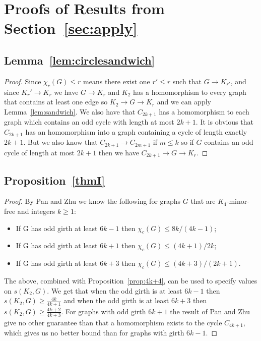 \documentclass[11pt,a4paper]{article}
\begin{document}
\section{Proofs of Results from Section~\ref{sec:apply}}

\subsection*{Lemma~\ref{lem:circlesandwich}}
\begin{proof}
Since $\chi_c(G) \leq r$ means there exist one $r' \leq r$ such that $G \rightarrow K_{r'}$, and since $K_r' \rightarrow K_r$ we have $G \rightarrow K_r$ and $K_2$ has a homomorphism to every graph that contains at least one edge so $K_2 \rightarrow G \rightarrow K_r$ and we can apply Lemma~\ref{lem:sandwich}. We also have that $C_{2k+1}$ has a homomorphism to each graph which contains an odd cycle with length at most $2k+1$. It is obvious that $C_{2k+1}$ has an homomorphism into a graph containing a cycle of length exactly $2k+1$. But we also know that $C_{2k+1} \rightarrow C_{2m+1}$ if $m \leq k$ so if $G$ contains an odd cycle of length at most $2k+1$ then we have $C_{2k+1} \rightarrow G \rightarrow K_r$. 
\end{proof}

\subsection*{Proposition~\ref{thmI}}
\begin{proof}
By Pan and Zhu we know the following for graphs $G$ that are
$K_4$-minor-free and integers $k\geq 1$:
\begin{itemize}
\item If G has odd girth at least $6k-1$ then $\chi_c(G)\leq 8k/(4k-1)$;
\item If G has odd girth at least $6k+1$ then $\chi_c(G)\leq (4k+1)/2k$;
\item If G has odd girth at least $6k+3$ then $\chi_c(G)\leq
(4k+3)/(2k+1)$.
\end{itemize}
The above, combined with Proposition~\ref{prop:4k+4}, can be used to
specify values on $s(K_2,G)$. We get that when the odd girth is at least
$6k-1$ then $s(K_2,G) \geq \frac{4k}{4k+1}$ and when the odd girth is at
least $6k+3$ then $s(K_2,G) \geq \frac{4k+2}{4k+3}$. For graphs with odd
girth $6k+1$ the result of Pan and Zhu give no other guarantee than that
a homomorphism exists to the cycle $C_{4k+1}$, which gives us no better
bound than for graphs with girth $6k-1$.
\end{proof}
\end{document}
